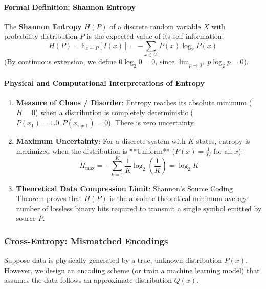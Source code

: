 \paragraph{Formal Definition: Shannon Entropy}
The \textbf{Shannon Entropy} $H(P)$ of a discrete random variable $X$ with probability distribution $P$ is the expected value of its self-information:
\begin{equation}
H(P) = \mathbb{E}_{x \sim P}[I(x)] = -\sum_{x \in \mathcal{X}} P(x) \log_2 P(x)\label{eq:shannon_entropy}
\end{equation}
(By continuous extension, we define $0 \log_2 0 = 0$, since $\lim_{p \to 0^+} p \log_2 p = 0$).

\paragraph{Physical and Computational Interpretations of Entropy}
\begin{enumerate}
    \item \textbf{Measure of Chaos / Disorder}: Entropy reaches its absolute minimum ($H = 0$) when a distribution is completely deterministic ($P(x_1) = 1.0, P(x_{i \ne 1}) = 0$). There is zero uncertainty.
    \item \textbf{Maximum Uncertainty}: For a discrete system with $K$ states, entropy is maximized when the distribution is **Uniform** ($P(x) = \frac{1}{K}$ for all $x$):
    \begin{equation}
    H_{\max} = -\sum_{k=1}^{K} \frac{1}{K} \log_2 \left(\frac{1}{K}\right) = \log_2 K\label{eq:max_entropy}
    \end{equation}
    \item \textbf{Theoretical Data Compression Limit}: Shannon's Source Coding Theorem proves that $H(P)$ is the absolute theoretical minimum average number of lossless binary bits required to transmit a single symbol emitted by source $P$.
\end{enumerate}

\subsubsection{Cross-Entropy: Mismatched Encodings}
Suppose data is physically generated by a true, unknown distribution $P(x)$. However, we design an encoding scheme (or train a machine learning model) that assumes the data follows an approximate distribution $Q(x)$.

